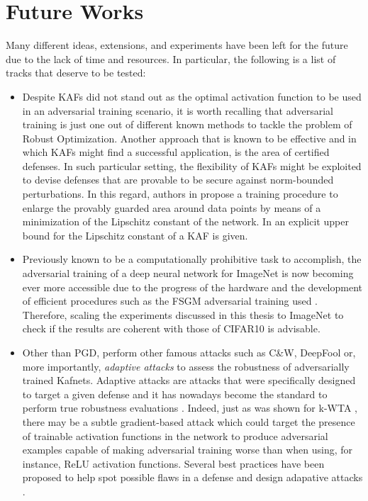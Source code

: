 \documentclass[LaM,binding=0.6cm]{./packages/sapthesis/sapthesis}
\begin{document}
        \section{Future Works}

        Many different ideas, extensions, and experiments have been left for the future due to the lack of time and resources. In particular, the following is a list of tracks that deserve to be tested:
        \begin{itemize}
            \item Despite KAFs did not stand out as the optimal activation function to be used in an adversarial training scenario, it is worth recalling that adversarial training is just one 
            out of different known methods to tackle the problem of Robust Optimization. Another approach that is known to be effective and in which KAFs might find a successful
            application, is the area of certified defenses. In such particular setting, the flexibility of KAFs might be exploited to devise defenses that are provable to be secure against 
            norm-bounded perturbations. In this regard, authors in \cite{lipschitz_train} propose a training procedure to enlarge the provably guarded area around data points 
            by means of a minimization of the Lipschitz constant of the network. In \cite{coello2003micai} an explicit upper bound for the Lipschitz
            constant of a KAF is given.

            \item Previously known to be a computationally prohibitive task to accomplish, the adversarial training of a deep neural network for ImageNet is now becoming ever more accessible 
                  due to the progress of the hardware and the development of efficient procedures such as the FSGM adversarial training used \cite{fast_adv_train}. Therefore, scaling the experiments discussed in this thesis
                  to ImageNet to check if the results are coherent with those of CIFAR10 is advisable. 

            \item Other than PGD, perform other famous attacks such as C\&W, DeepFool or, more importantly, \textit{adaptive attacks} to assess the robustness of adversarially trained Kafnets. 
            Adaptive attacks are attacks that were specifically designed to target a given defense and it has nowadays become the standard to perform true robustness evaluations \cite{towards_eval_robustness}.
            Indeed, just as was shown for k-WTA \cite{carlinikwta}, there may be a subtle gradient-based attack which could target the presence of trainable activation functions in the network 
            to produce adversarial examples capable of making adversarial training worse than when using, for instance, ReLU activation functions. Several best practices have been proposed to help spot possible flaws 
            in a defense and design adapative attacks \cite{carlinikwta}.
        \end{itemize}
            

    
   
    
\appendix


\backmatter
\printbibliography
\end{document}
